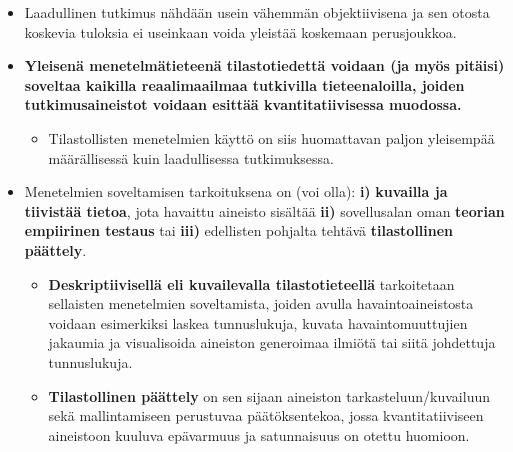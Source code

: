 \documentclass[
]{book}
\providecommand{\tightlist}{%
  \setlength{\itemsep}{0pt}\setlength{\parskip}{0pt}}
\begin{document}
\begin{itemize}
\begin{itemize}
\begin{itemize}
      \begin{itemize}
      \tightlist
      \item
        Laadullinen tutkimus nähdään usein vähemmän objektiivisena ja sen otosta koskevia tuloksia ei useinkaan voida yleistää koskemaan perusjoukkoa.
      \end{itemize}
    \end{itemize}
  \end{itemize}
\end{itemize}

\hfill\break
\hfill\break

\begin{itemize}
\tightlist
\item
  \textbf{Yleisenä menetelmätieteenä tilastotiedettä voidaan (ja myös pitäisi) soveltaa kaikilla reaalimaailmaa tutkivilla tieteenaloilla, joiden tutkimusaineistot voidaan esittää kvantitatiivisessa muodossa.}

  \begin{itemize}
  \tightlist
  \item
    Tilastollisten menetelmien käyttö on siis huomattavan paljon yleisempää määrällisessä kuin laadullisessa tutkimuksessa.
  \end{itemize}
\item
  Menetelmien soveltamisen tarkoituksena on (voi olla):
  \textbf{i)} \textbf{kuvailla ja tiivistää tietoa}, jota havaittu aineisto sisältää
  \textbf{ii)} sovellusalan oman \textbf{teorian empiirinen testaus} tai
  \textbf{iii)} edellisten pohjalta tehtävä \textbf{tilastollinen päättely}.

  \begin{itemize}
  \tightlist
  \item
    \textbf{Deskriptiivisellä eli kuvailevalla tilastotieteellä} tarkoitetaan sellaisten menetelmien soveltamista, joiden avulla havaintoaineistosta voidaan esimerkiksi laskea tunnuslukuja, kuvata havaintomuuttujien jakaumia ja visualisoida aineiston generoimaa ilmiötä tai siitä johdettuja tunnuslukuja.
  \item
    \textbf{Tilastollinen päättely} on sen sijaan aineiston tarkasteluun/kuvailuun sekä mallintamiseen perustuvaa päätöksentekoa, jossa kvantitatiiviseen aineistoon kuuluva epävarmuus ja satunnaisuus on otettu huomioon.


\end{itemize}
\end{itemize}
\end{document}
